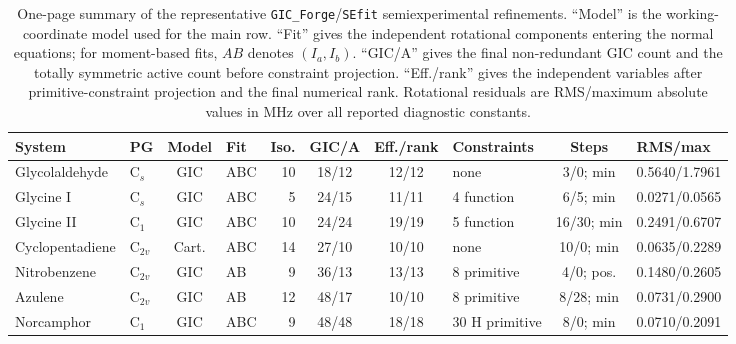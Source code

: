 \begin{table}
\caption{One-page summary of the representative \texttt{GIC\_Forge}/\texttt{SEfit}
semiexperimental refinements. ``Model'' is the working-coordinate model used
for the main row. ``Fit'' gives the independent rotational components entering
the normal equations; for moment-based fits, $AB$ denotes $(I_a,I_b)$. ``GIC/A''
gives the final non-redundant GIC count and the totally symmetric active count
before constraint projection. ``Eff./rank'' gives the independent variables
after primitive-constraint projection and the final numerical rank. Rotational
residuals are RMS/maximum absolute values in MHz over all reported diagnostic
constants.}
\label{tab:benchmark-summary}
\scriptsize
\setlength{\tabcolsep}{2.0pt}
\begin{tabular}{@{}llclrcclcl@{}}
\toprule
System & PG & Model & Fit & Iso. & GIC/A & Eff./rank & Constraints & Steps & RMS/max \\
\midrule
Glycolaldehyde & C$_s$ & GIC & ABC & 10 & 18/12 & 12/12 & none & 3/0; min & 0.5640/1.7961 \\
Glycine I & C$_s$ & GIC & ABC & 5 & 24/15 & 11/11 & 4 function & 6/5; min & 0.0271/0.0565 \\
Glycine II & C$_1$ & GIC & ABC & 10 & 24/24 & 19/19 & 5 function & 16/30; min & 0.2491/0.6707 \\
Cyclopentadiene & C$_{2v}$ & Cart. & ABC & 14 & 27/10 & 10/10 & none & 10/0; min & 0.0635/0.2289 \\
Nitrobenzene & C$_{2v}$ & GIC & AB & 9 & 36/13 & 13/13 & 8 primitive & 4/0; pos. & 0.1480/0.2605 \\
Azulene & C$_{2v}$ & GIC & AB & 12 & 48/17 & 10/10 & 8 primitive & 8/28; min & 0.0731/0.2900 \\
Norcamphor & C$_1$ & GIC & ABC & 9 & 48/48 & 18/18 & 30 H primitive & 8/0; min & 0.0710/0.2091 \\
\bottomrule
\end{tabular}
\end{table}
